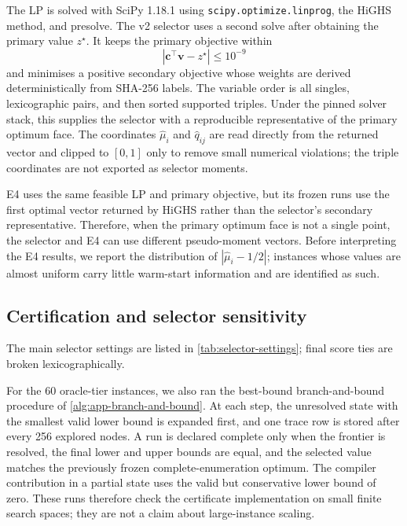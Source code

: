 \documentclass[a4paper,onecolumn,11pt,unpublished]{quantumarticle}
\theoremstyle{remark}
\begin{document}
The LP is solved with SciPy 1.18.1 using
\texttt{scipy.optimize.linprog}, the HiGHS method, and presolve.  The v2
selector uses a second solve after obtaining the primary value $z^\star$.  It
keeps the primary objective within
\begin{equation}
  \left|\bm c^\top\bm v-z^\star\right|\leq10^{-9}
  \label{eq:experimental-rlt-optimum-face}
\end{equation}
and minimises a positive secondary objective whose weights are derived
deterministically from SHA-256 labels.  The variable order is all singles,
lexicographic pairs, and then sorted supported triples.  Under the pinned
solver stack, this supplies the selector with a reproducible representative of
the primary optimum face.  The coordinates $\widehat\mu_i$ and
$\widehat q_{ij}$ are read directly from the returned vector and clipped to
$[0,1]$ only to remove small numerical violations; the triple coordinates are
not exported as selector moments.

E4 uses the same feasible LP and primary objective, but its frozen runs use the
first optimal vector returned by HiGHS rather than the selector's secondary
representative.  Therefore, when the primary optimum face is not a single
point, the selector and E4 can use different pseudo-moment vectors.  Before
interpreting the E4 results, we report the distribution of
$|\widehat\mu_i-1/2|$; instances whose values are almost uniform carry little
warm-start information and are identified as such.

\subsection{Certification and selector sensitivity}
\label{app:experimental-sensitivity}

The main selector settings are listed in \cref{tab:selector-settings}; final
score ties are broken lexicographically.

For the 60 oracle-tier instances, we also ran the best-bound branch-and-bound
procedure of \cref{alg:app-branch-and-bound}.  At each step, the unresolved
state with the smallest valid lower bound is expanded first, and one trace row
is stored after every 256 explored nodes.  A run is declared complete only
when the frontier is resolved, the final lower and upper bounds are equal, and
the selected value matches the previously frozen complete-enumeration optimum.
The compiler contribution in a partial state uses the valid but conservative
lower bound of zero.  These runs therefore check the certificate
implementation on small finite search spaces; they are not a claim about
large-instance scaling.
\end{document}
